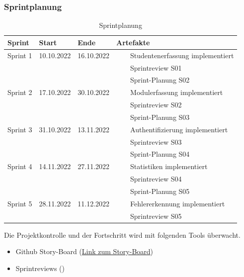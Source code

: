 \documentclass[a4paper, table]{article}
\newcommand{\tabitem}{~~\llap{\textbullet}~~}
\begin{document}
\subsubsection*{Sprintplanung}
\begin{table}[h]
    \centering
    \begin{tabular}{|l|l|l|l|}
        \hline
        \rowcolor[gray]{.9} Sprint & Start & Ende & Artefakte \\
        \hline
        Sprint 1 & 10.10.2022 & 16.10.2022 & \tabitem Studentenerfassung implementiert \\
         & & & \tabitem Sprintreview S01 \\
         & & & \tabitem Sprint-Planung S02 \\
        \hline
        Sprint 2 & 17.10.2022 & 30.10.2022 & \tabitem Modulerfassung implementiert \\
         & & & \tabitem Sprintreview S02 \\
         & & & \tabitem Sprint-Planung S03 \\
        \hline
        Sprint 3 & 31.10.2022 & 13.11.2022 & \tabitem Authentifizierung implementiert \\
         & & & \tabitem Sprintreview S03 \\
         & & & \tabitem Sprint-Planung S04 \\
        \hline
        Sprint 4 & 14.11.2022 & 27.11.2022 & \tabitem Statistiken implementiert \\
         & & & \tabitem Sprintreview S04 \\
         & & & \tabitem Sprint-Planung S05 \\
        \hline
        Sprint 5 & 28.11.2022 & 11.12.2022 & \tabitem Fehlererkennung implementiert \\
         & & & \tabitem Sprintreview S05 \\
        \hline
    \end{tabular}
    \caption{Sprintplanung}
    \label{tab: Sprintplanung}
\end{table}

Die Projektkontrolle und der Fortschritt wird mit folgenden Tools überwacht.
\begin{itemize}
    \item Github Story-Board (\href{https://github.com/orgs/stairch/projects/1/views/4}{Link zum Story-Board})
    \item Sprintreviews ()
\end{itemize}
\end{document}
